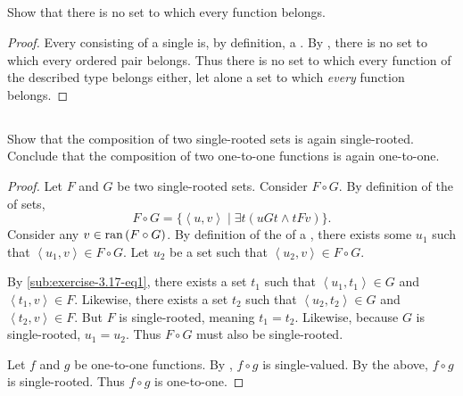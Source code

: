 \documentclass{report}
\begin{document}
\subsection{}%
\label{sub:exercise-3.16}

Show that there is no set to which every function belongs.

\begin{proof}

  Every  consisting of a single 
    is, by definition, a .
  By , there is no set to which every ordered pair
    belongs.
  Thus there is no set to which every function of the described type belongs
    either, let alone a set to which \textit{every} function belongs.

\end{proof}

\subsection{}%
\label{sub:exercise-3.17}

Show that the composition of two single-rooted sets is again single-rooted.
Conclude that the composition of two one-to-one functions is again one-to-one.

\begin{proof}

  Let $F$ and $G$ be two single-rooted sets.
  Consider $F \circ G$.
  By definition of the  of sets,
    \begin{equation}
      \label{sub:exercise-3.17-eq1}
      F \circ G = \{\left< u, v \right> \mid \exists t(uGt \land tFv)\}.
    \end{equation}
  Consider any $v \in \mathop{\text{ran}}{(F \circ G)}$.
  By definition of the  of a , there
    exists some $u_1$ such that $\left< u_1, v \right> \in F \circ G$.
  Let $u_2$ be a set such that $\left< u_2, v \right> \in F \circ G$.

  By \eqref{sub:exercise-3.17-eq1}, there exists a set $t_1$ such that
    $\left< u_1, t_1 \right> \in G$ and $\left< t_1, v \right> \in F$.
  Likewise, there exists a set $t_2$ such that
    $\left< u_2, t_2 \right> \in G$ and $\left< t_2, v \right> \in F$.
  But $F$ is single-rooted, meaning $t_1 = t_2$.
  Likewise, because $G$ is single-rooted, $u_1 = u_2$.
  Thus $F \circ G$ must also be single-rooted.

  \suitdivider

  Let $f$ and $g$ be one-to-one functions.
  By , $f \circ g$ is single-valued.
  By the above, $f \circ g$ is single-rooted.
  Thus $f \circ g$ is one-to-one.

\end{proof}
\end{document}

